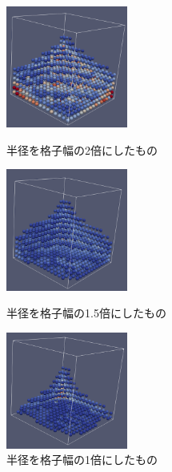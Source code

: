 \documentclass[a4j,12pt]{jreport}
\begin{document}
\begin{figure}[H]
  \begin{minipage}[b]{0.45\linewidth}
    \centering
    \includegraphics[width=40mm]{r2.png}
    \caption{半径を格子幅の2倍にしたもの}
    \label{fig:ParaView1}
  \end{minipage}
  \begin{minipage}[b]{0.45\linewidth}
    \centering
    \includegraphics[width=40mm]{r15.png}
    \caption{半径を格子幅の1.5倍にしたもの}
    \label{fig:ParaView2}
  \end{minipage}
  \begin{minipage}[b]{0.45\linewidth}
    \centering
    \includegraphics[width=40mm]{r1.png}
    \caption{半径を格子幅の1倍にしたもの}
    \label{fig:ParaView3}
  \end{minipage}
\end{figure}
\end{document}
